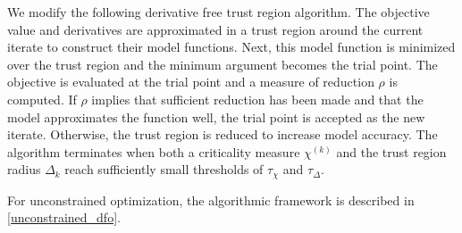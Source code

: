 \documentclass{article}
\theoremstyle{case}
\numberwithin{theorem}{subsection}
\newcommand{\chik}{{\chi^{(k)}}}
\begin{document}
We modify the following derivative free trust region algorithm.
The objective value and derivatives are approximated in a trust region around the current iterate to construct their model functions.
Next, this model function is minimized over the trust region and the minimum argument becomes the trial point.
The objective is evaluated at the trial point and a measure of reduction $\rho$ is computed.
If $\rho$ implies that sufficient reduction has been made and that the model approximates the function well, the trial point is accepted as the new iterate.
Otherwise, the trust region is reduced to increase model accuracy.
The algorithm terminates when both a criticality measure $\chik$ and the trust region radius $\Delta_k$ reach sufficiently small thresholds of $\tau_{\chi}$ and $\tau_{\Delta}$.


For unconstrained optimization, the algorithmic framework is described in \cref{unconstrained_dfo}.
\end{document}
